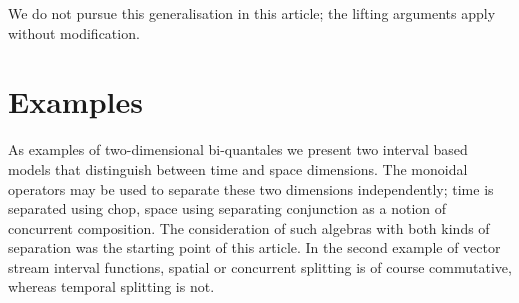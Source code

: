 \documentclass[12pt]{article}
\theoremstyle{definition}
\begin{document}
We do not pursue this generalisation in this article; the lifting
arguments apply without modification.



\section{Examples}\label{sec:biquantale-examples}

As examples of two-dimensional bi-quantales we present two interval
based models that distinguish between time and space dimensions. The
monoidal operators may be used to separate these two dimensions
independently; time is separated using chop, space using separating
conjunction as a notion of concurrent composition. The consideration
of such algebras with both kinds of separation was the starting point
of this article. In the second example of vector stream interval
functions, spatial or concurrent splitting is of course commutative,
whereas temporal splitting is not.
\end{document}
